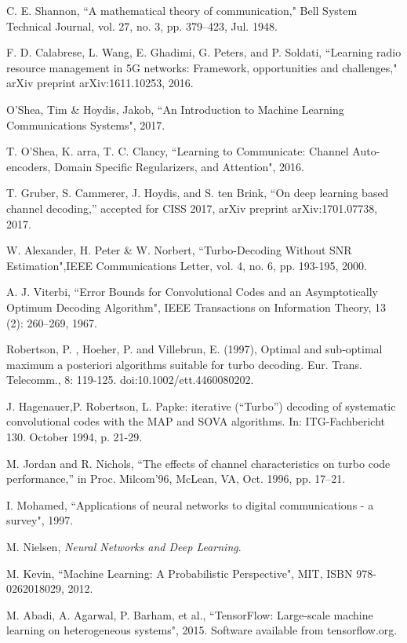 \documentclass[conference]{IEEEtran}
\begin{document}
\begin{thebibliography}{00}
 C. E. Shannon, ``A mathematical theory of communication," Bell System Technical Journal, vol. 27, no. 3, pp. 379–423, Jul. 1948.


 F. D. Calabrese, L. Wang, E. Ghadimi, G. Peters, and P. Soldati, ``Learning radio resource management in 5G networks: Framework, opportunities and challenges," arXiv preprint arXiv:1611.10253, 2016.

 O'Shea, Tim \& Hoydis, Jakob, ``An Introduction to Machine Learning Communications Systems", 2017.

 T. O'Shea, K. arra, T. C. Clancy, ``Learning to Communicate: Channel Auto-encoders, Domain Specific Regularizers, and Attention", 2016.

 T. Gruber, S. Cammerer, J. Hoydis, and S. ten Brink, “On deep learning based channel decoding,” accepted for CISS 2017, arXiv preprint arXiv:1701.07738, 2017.

 W. Alexander, H. Peter \& W. Norbert, ``Turbo-Decoding Without SNR Estimation",IEEE Communications Letter, vol. 4, no. 6, pp. 193-195, 2000.

 A. J. Viterbi, ``Error Bounds for Convolutional Codes and an Asymptotically Optimum Decoding Algorithm", IEEE Transactions on Information Theory, 13 (2): 260–269, 1967.

 Robertson, P. , Hoeher, P. and Villebrun, E. (1997), Optimal and sub‐optimal maximum a posteriori algorithms suitable for turbo decoding. Eur. Trans. Telecomm., 8: 119-125. doi:10.1002/ett.4460080202.

 J. Hagenauer,P. Robertson, L. Papke: iterative (“Turbo”) decoding of systematic convolutional codes with the MAP and SOVA
algorithms. In: ITG-Fachbericht 130. October 1994, p. 21-29.

 M. Jordan and R. Nichols, “The effects of channel characteristics on turbo code performance,” in Proc. Milcom’96, McLean, VA, Oct. 1996, pp. 17–21.

 I. Mohamed, ``Applications of neural networks to digital communications - a survey", 1997.

 M. Nielsen, \textit{Neural Networks and Deep Learning}.

 M. Kevin, ``Machine Learning: A Probabilistic Perspective", MIT, ISBN 978-0262018029, 2012.

 M. Abadi, A. Agarwal, P. Barham, et al., 
``TensorFlow: Large-scale machine learning on heterogeneous systems", 2015. Software available from tensorflow.org.


\end{thebibliography}
\end{document}
